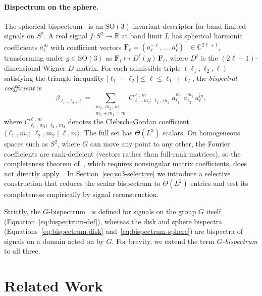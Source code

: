 \documentclass{article}
\theoremstyle{definition}
\theoremstyle{remark}
\newcommand{\R}{\mathbb{R}}
\newcommand{\C}{\mathbb{C}}
\newcommand{\SO}{\mathrm{SO}}
\newcommand{\CG}[6]{C^{#5,\,#6}_{#1,\,#2;\,#3,\,#4}}
\newcommand{\conj}[1]{\overline{#1}}
\theoremstyle{definition}
\begin{document}
\paragraph{Bispectrum on the sphere.}
The spherical bispectrum~\citep{kakarala2012bispectrum} is an
$\SO(3)$-invariant descriptor for band-limited signals on $S^2$.
A real signal $f : S^2 \to \R$ at band limit $L$ has spherical harmonic
coefficients $a_\ell^m$ with coefficient vectors
$\mathbf{F}_\ell = (a_\ell^{-\ell},\ldots,a_\ell^{\ell})^\top
\in \C^{2\ell+1}$, transforming under $g\in\SO(3)$ as
$\mathbf{F}_\ell \mapsto D^\ell(g)\,\mathbf{F}_\ell$, where $D^\ell$
is the $(2\ell{+}1)$-dimensional Wigner $D$-matrix.
For each admissible triple $(\ell_1,\ell_2,\ell)$ satisfying the
triangle inequality
$|\ell_1 - \ell_2| \le \ell \le \ell_1 + \ell_2$, the
\emph{bispectral coefficient} is
\begin{equation}\label{eq:bispectrum-sphere}
  \beta_{\ell_1,\ell_2,\ell}
  = \sum_{\substack{m_1,\,m_2,\,m \\ m_1+m_2=m}}
    \CG{\ell_1}{m_1}{\ell_2}{m_2}{\ell}{m}\;
    a_{\ell_1}^{m_1}\,a_{\ell_2}^{m_2}\,\conj{a_\ell^m},
\end{equation}
where $\CG{\ell_1}{m_1}{\ell_2}{m_2}{\ell}{m}$ denotes the
Clebsch--Gordan coefficient
$\langle \ell_1, m_1;\, \ell_2, m_2 \mid \ell, m \rangle$.
The full set has $\Theta(L^3)$ scalars. On homogeneous spaces such as
$S^2$, where $G$ can move any point to any other, the Fourier coefficients are rank-deficient
(vectors rather than full-rank matrices), so the completeness theorem
of~\citet{kakarala2012bispectrum}, which requires nonsingular matrix coefficients, does not
directly apply~\citep{kondor2007novel}. In Section~\ref{sec:so3-selective} we
introduce a selective construction that reduces the scalar bispectrum to
$\Theta(L^2)$ entries and test its completeness empirically by
signal reconstruction.

Strictly, the $G$-bispectrum~\citep{kakarala1992triple, mataigne2024selective} is defined for
signals on the group $G$ itself (Equation~\eqref{eq:bispectrum-def}), whereas the disk and
sphere bispectra (Equations~\eqref{eq:bispectrum-disk} and~\eqref{eq:bispectrum-sphere}) are
bispectra of signals on a domain acted on by $G$. For brevity, we extend the term
\emph{$G$-bispectrum} to all three.




\section{Related Work}
\label{sec:related}
\end{document}
